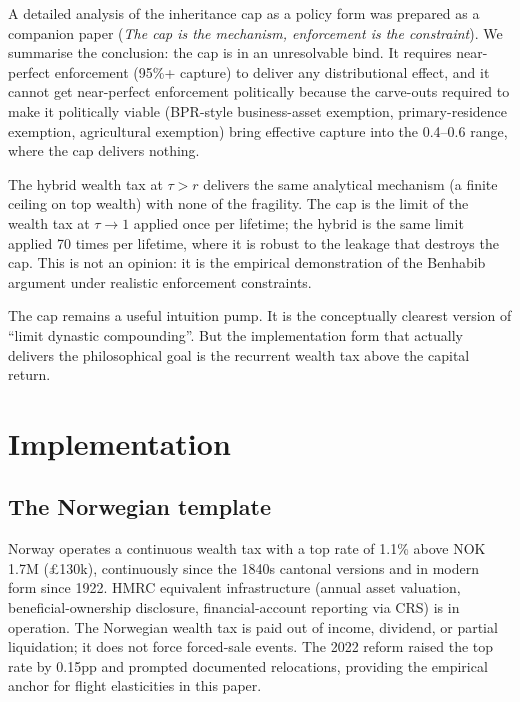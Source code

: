 \documentclass[11pt]{article}
\begin{document}
A detailed analysis of the inheritance cap as a policy form was
prepared as a companion paper (\emph{The cap is the mechanism,
enforcement is the constraint}).  We summarise the conclusion: the
cap is in an unresolvable bind.  It requires near-perfect
enforcement (95\%+ capture) to deliver any distributional effect,
and it cannot get near-perfect enforcement politically because
the carve-outs required to make it politically viable (BPR-style
business-asset exemption, primary-residence exemption,
agricultural exemption) bring effective capture into the
0.4--0.6 range, where the cap delivers nothing.

The hybrid wealth tax at $\tau > r$ delivers the same analytical
mechanism (a finite ceiling on top wealth) with none of the
fragility.  The cap is the limit of the wealth tax at $\tau \to 1$
applied once per lifetime; the hybrid is the same limit applied
70 times per lifetime, where it is robust to the leakage that
destroys the cap.  This is not an opinion: it is the empirical
demonstration of the Benhabib argument under realistic
enforcement constraints.

The cap remains a useful intuition pump.  It is the conceptually
clearest version of ``limit dynastic compounding''.  But the
implementation form that actually delivers the philosophical goal
is the recurrent wealth tax above the capital return.

\section{Implementation}
\label{sec:implementation}

\subsection{The Norwegian template}

Norway operates a continuous wealth tax with a top rate of 1.1\%
above NOK 1.7M (\pounds 130k), continuously since the 1840s
cantonal versions and in modern form since 1922.  HMRC equivalent
infrastructure (annual asset valuation, beneficial-ownership
disclosure, financial-account reporting via CRS) is in operation.
The Norwegian wealth tax is paid out of income, dividend, or
partial liquidation; it does not force forced-sale events.  The
2022 reform raised the top rate by 0.15pp and prompted documented
relocations, providing the empirical anchor for flight
elasticities in this paper.
\end{document}
